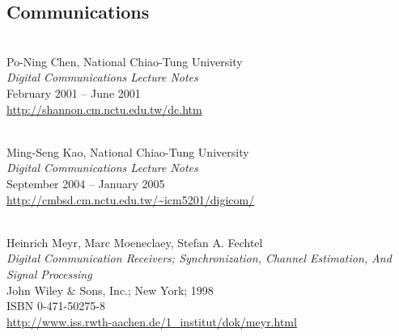 



\begin{thebibliography}{9}


\subsection*{Communications}
\hspace{1pt}                           \\
   Po-Ning Chen, National Chiao-Tung University   \\   
   {\em Digital Communications Lecture Notes}     \\
   February 2001 -- June 2001                     \\
   \url{http://shannon.cm.nctu.edu.tw/dc.htm}                 

\hspace{1pt}                           \\
   Ming-Seng Kao, National Chiao-Tung University   \\   
   {\em Digital Communications Lecture Notes}     \\
   September 2004 -- January 2005                  \\
   \url{http://cmbsd.cm.nctu.edu.tw/~icm5201/digicom/}

\hspace{1pt}                      \\
   Heinrich Meyr, Marc Moeneclaey, Stefan A. Fechtel   \\   
   {\em Digital Communication Receivers; 
        Synchronization, Channel Estimation, And Signal Processing}   \\
   John Wiley \& Sons, Inc.; New York; 1998 \\
   ISBN 0-471-50275-8  \\
   \url{http://www.iss.rwth-aachen.de/1_institut/dok/meyr.html}


\end{thebibliography}
